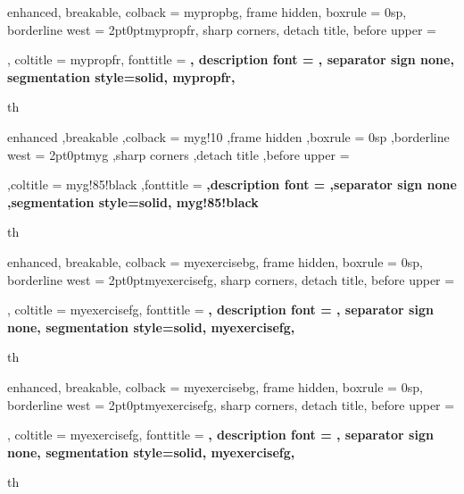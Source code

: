 {%
    enhanced,
    breakable,
    colback = mypropbg,
    frame hidden,
    boxrule = 0sp,
    borderline west = {2pt}{0pt}{mypropfr},
    sharp corners,
    detach title,
    before upper = \tcbtitle\par\smallskip,
    coltitle = mypropfr,
    fonttitle = \bfseries\sffamily,
    description font = \mdseries,
    separator sign none,
    segmentation style={solid, mypropfr},
}
{th}



{%
    enhanced
    ,breakable
    ,colback = myg!10
    ,frame hidden
    ,boxrule = 0sp
    ,borderline west = {2pt}{0pt}{myg}
    ,sharp corners
    ,detach title
    ,before upper = \tcbtitle\par\smallskip
    ,coltitle = myg!85!black
    ,fonttitle = \bfseries\sffamily
    ,description font = \mdseries
    ,separator sign none
    ,segmentation style={solid, myg!85!black}
}
{th}




{%
    enhanced,
    breakable,
    colback = myexercisebg,
    frame hidden,
    boxrule = 0sp,
    borderline west = {2pt}{0pt}{myexercisefg},
    sharp corners,
    detach title,
    before upper = \tcbtitle\par\smallskip,
    coltitle = myexercisefg,
    fonttitle = \bfseries\sffamily,
    description font = \mdseries,
    separator sign none,
    segmentation style={solid, myexercisefg},
}
{th}

{%
    enhanced,
    breakable,
    colback = myexercisebg,
    frame hidden,
    boxrule = 0sp,
    borderline west = {2pt}{0pt}{myexercisefg},
    sharp corners,
    detach title,
    before upper = \tcbtitle\par\smallskip,
    coltitle = myexercisefg,
    fonttitle = \bfseries\sffamily,
    description font = \mdseries,
    separator sign none,
    segmentation style={solid, myexercisefg},
}
{th}


